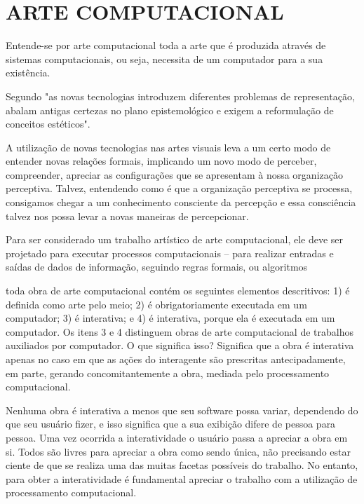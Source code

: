 \chapter{ARTE COMPUTACIONAL}


Entende-se  por  arte  computacional  toda  a  arte  que  é  produzida  através  de  sistemas  computacionais,  ou  seja,  necessita  de  um  computador  para  a  sua  existência. \cite[p.36]{boone}

Segundo  "as novas tecnologias introduzem diferentes problemas de representação, abalam antigas certezas no plano epistemológico e exigem a reformulação de conceitos estéticos".
								
A utilização de novas tecnologias nas artes visuais leva a um certo modo de entender novas relações formais, implicando um novo modo de perceber, compreender, apreciar as configurações que se apresentam à nossa organização perceptiva. Talvez, entendendo como é que a organização perceptiva se processa, consigamos chegar a um conhecimento consciente da percepção e essa consciência talvez nos possa levar a novas maneiras de percepcionar. \cite[p. 55]{azevedo}

Para ser considerado um trabalho artístico de arte computacional, ele deve ser projetado para executar processos computacionais – para realizar entradas e saídas de dados de informação, seguindo regras formais, ou algoritmos \cite[p. 132]{venturelli}

toda obra de arte computacional contém os seguintes elementos descritivos: 1) é definida como arte pelo meio; 2) é obrigatoriamente executada em um computador; 3) é interativa; e 4) é interativa, porque ela é executada em um computador. Os itens 3 e 4 distinguem obras de arte computacional de trabalhos auxiliados por computador. O que significa isso? Significa que a obra é interativa apenas no caso em que as ações do interagente são prescritas antecipadamente, em parte, gerando concomitantemente a obra, mediada pelo processamento computacional.  \cite[p. 133]{venturelli}

Nenhuma obra é interativa a menos que seu software possa variar, dependendo do que seu usuário fizer, e isso significa que a sua exibição difere de pessoa para pessoa. Uma vez ocorrida a interatividade o usuário passa a apreciar a obra em si. Todos são livres para apreciar a obra como sendo única, não precisando estar ciente de que se realiza uma das muitas facetas possíveis do trabalho. No entanto, para obter a interatividade é fundamental apreciar o trabalho com a utilização de processamento computacional.  \cite[p. 138-139]{venturelli}

